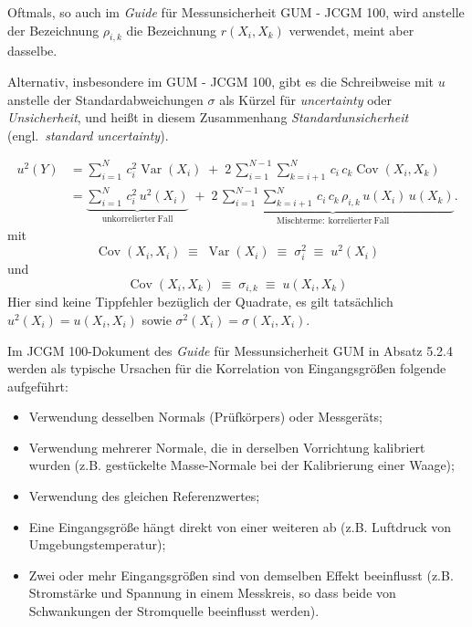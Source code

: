 Oftmals, so auch im \textsl{Guide} für Messunsicherheit GUM - JCGM 100, wird anstelle der
Bezeichnung $\rho_{i,k}$ die
Bezeichnung $r(X_{i},X_{k})$ verwendet, meint aber dasselbe.

Alternativ, insbesondere im GUM - JCGM 100, gibt es die Schreibweise mit $u$ anstelle der
Standardabweichungen $\sigma$ als Kürzel für \textsl{uncertainty} oder \textsl{Unsicherheit},
und heißt in diesem Zusammenhang \textsl{Standardunsicherheit} (engl.\ \textsl{standard uncertainty}).

\begin{equation}
{\begin{aligned}
u^2(Y) & = \sum\limits_{i=1}^{N} \, c_i^2 \operatorname {Var}(X_{i}) \; + \; 2 \, \sum _{{i=1}}^{{N-1}}
  \sum\limits_{k=i+1}^{N} \, c_i \, c_k \operatorname {Cov}(X_{i},X_{k})\\
 & = \underbrace{\sum\limits_{i=1}^{N} \, c_i^2 \, u^2(X_i)}_{\mathrm{unkorrelierter~Fall}} \;  + \;
 \underbrace{2 \, \sum\limits_{i=1}^{{N-1}}
 \sum\limits_{k=i+1}^{N} \, c_i \, c_k \, \rho_{i,k} \, u(X_i) \, u(X_k)}_{\mathrm{Mischterme:~korrelierter~Fall}} .
\end{aligned}}
\label{UnsichFortpfl2}
\end{equation}
mit
\begin{equation}
\operatorname{Cov}(X_i, X_i) \; \equiv \; \operatorname{Var}(X_i)
\; \equiv \; \sigma^2_i \; \equiv \;  u^2(X_i)
\end{equation}
und
\begin{equation}
\operatorname{Cov}(X_i, X_k) \; \equiv \;
\sigma_{i,k} \; \equiv \; u(X_i,X_k)
\end{equation}
Hier sind keine Tippfehler bezüglich der Quadrate, es gilt tatsächlich $u^2(X_i) = u(X_i,X_i)$
sowie $\sigma^2(X_i) = \sigma(X_i,X_i)$.

Im JCGM 100-Dokument des \textsl{Guide} für Messunsicherheit GUM in Absatz 5.2.4
werden als typische Ursachen für die Korrelation von Eingangsgrößen  folgende aufgeführt:
\begin{itemize}
\item Verwendung desselben Normals (Prüfkörpers) oder Messgeräts;
\item Verwendung mehrerer Normale, die in derselben Vorrichtung kalibriert
wurden (z.B. gestückelte Masse-Normale bei der Kalibrierung einer Waage);
\item Verwendung des gleichen Referenzwertes;
\item Eine Eingangsgröße hängt direkt von einer weiteren ab
(z.B. Luftdruck von Um\-geb\-ungs\-tem\-pe\-ra\-tur);
\item Zwei oder mehr Eingangsgrößen sind von
demselben Effekt beeinflusst
(z.B. Stromstärke und Spannung in einem Messkreis, so dass beide
von Schwankungen der Stromquelle beeinflusst werden).
\end{itemize}

